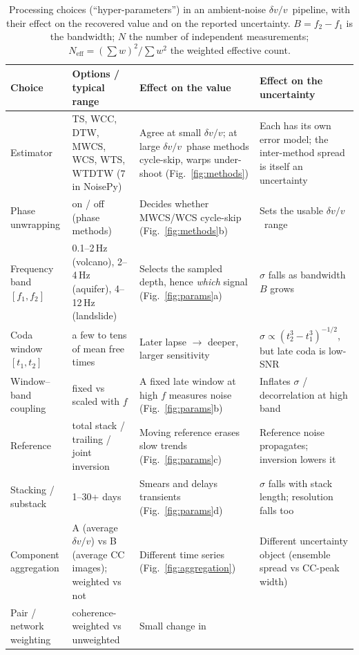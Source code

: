 \documentclass[
  11pt,
  letterpaper,
]{article}
\providecommand{\dvv}{\ensuremath{\delta v/v}}
\begin{document}
\begin{table}[htbp]
\footnotesize
\caption{Processing choices (``hyper-parameters'') in an ambient-noise \dvv\
pipeline, with their effect on the recovered value and on the reported
uncertainty. $B=f_2-f_1$ is the bandwidth; $N$ the number of independent
measurements; $N_{\mathrm{eff}}=(\sum w)^2/\sum w^2$ the weighted effective count.}
\label{tab:hyperparams}
\begin{tabularx}{\textwidth}{@{}>{\raggedright\arraybackslash}p{2.35cm} L L L@{}}
\toprule
\textbf{Choice} & \textbf{Options / typical range} & \textbf{Effect on the
value} & \textbf{Effect on the uncertainty} \\
\midrule
Estimator & TS, WCC, DTW, MWCS, WCS, WTS, WTDTW (7 in NoisePy) &
Agree at small \dvv; at large \dvv\ phase methods cycle-skip, warps under-shoot
(Fig.~\ref{fig:methods}) & Each has its own error model; the inter-method spread
is itself an uncertainty \\ \hline
Phase unwrapping & on / off (phase methods) & Decides whether MWCS/WCS cycle-skip
(Fig.~\ref{fig:methods}b) & Sets the usable \dvv\ range \\ \hline
Frequency band $[f_1,f_2]$ & 0.1--2\,Hz (volcano), 2--4\,Hz (aquifer),
4--12\,Hz (landslide) & Selects the sampled depth, hence \emph{which} signal
(Fig.~\ref{fig:params}a) & $\sigma$ falls as bandwidth $B$ grows \\ \hline
Coda window $[t_1,t_2]$ & a few to tens of mean free times & Later lapse $\to$
deeper, larger sensitivity & $\sigma\propto(t_2^3-t_1^3)^{-1/2}$, but late coda
is low-SNR \\ \hline
Window--band coupling & fixed vs scaled with $f$ & A fixed late window at high
$f$ measures noise (Fig.~\ref{fig:params}b) & Inflates $\sigma$ / decorrelation
at high band \\ \hline
Reference & total stack / trailing / joint inversion & Moving reference erases
slow trends (Fig.~\ref{fig:params}c) & Reference noise propagates; inversion
lowers it \\ \hline
Stacking / substack & 1--30+ days & Smears and delays transients
(Fig.~\ref{fig:params}d) & $\sigma$ falls with stack length; resolution falls
too \\ \hline
Component aggregation & A (average \dvv) vs B (average CC images); weighted vs
not & Different time series (Fig.~\ref{fig:aggregation}) & Different uncertainty
object (ensemble spread vs CC-peak width) \\ \hline
Pair / network weighting & coherence-weighted vs unweighted & Small change in

\end{tabularx}
\end{table}
\end{document}
